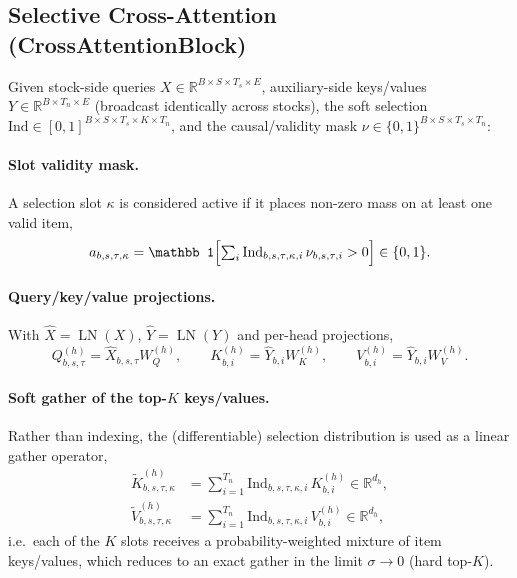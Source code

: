 \documentclass[stu,floatsintext]{apa7}
\newcommand{\R}{\mathbb{R}}
\newcommand{\LN}{\operatorname{LN}}
\begin{document}
\subsection{Selective Cross-Attention (CrossAttentionBlock)}

Given stock-side queries $X\in\R^{B\times S\times T_s\times E}$, auxiliary-side keys/values
$Y\in\R^{B\times T_n\times E}$ (broadcast identically across stocks), the soft selection
$\mathrm{Ind}\in[0,1]^{B\times S\times T_s\times K\times T_n}$, and the causal/validity mask
$\nu\in\{0,1\}^{B\times S\times T_s\times T_n}$:

\paragraph{Slot validity mask.} A selection slot $\kappa$ is considered active if it places non-zero mass
on at least one valid item,
\begin{equation}
  a_{b,s,\tau,\kappa} = \mathbb 1\Bigl[\textstyle\sum_{i} \mathrm{Ind}_{b,s,\tau,\kappa,i}\,\nu_{b,s,\tau,i} > 0\Bigr]
  \in\{0,1\}.
\end{equation}

\paragraph{Query/key/value projections.} With $\hat X=\LN(X)$, $\hat Y = \LN(Y)$ and per-head projections,
\begin{equation}
  Q^{(h)}_{b,s,\tau} = \hat X_{b,s,\tau} W_Q^{(h)}, \qquad
  K^{(h)}_{b,i} = \hat Y_{b,i} W_K^{(h)}, \qquad
  V^{(h)}_{b,i} = \hat Y_{b,i} W_V^{(h)}.
\end{equation}

\paragraph{Soft gather of the top-$K$ keys/values.} Rather than indexing, the (differentiable) selection
distribution is used as a linear gather operator,
\begin{align}
  \tilde K^{(h)}_{b,s,\tau,\kappa} &= \sum_{i=1}^{T_n} \mathrm{Ind}_{b,s,\tau,\kappa,i}\, K^{(h)}_{b,i}
  \in\R^{d_h}, \\
  \tilde V^{(h)}_{b,s,\tau,\kappa} &= \sum_{i=1}^{T_n} \mathrm{Ind}_{b,s,\tau,\kappa,i}\, V^{(h)}_{b,i}
  \in\R^{d_h},
\end{align}
i.e.\ each of the $K$ slots receives a probability-weighted mixture of item keys/values, which reduces to
an exact gather in the limit $\sigma\to0$ (hard top-$K$).
\end{document}

